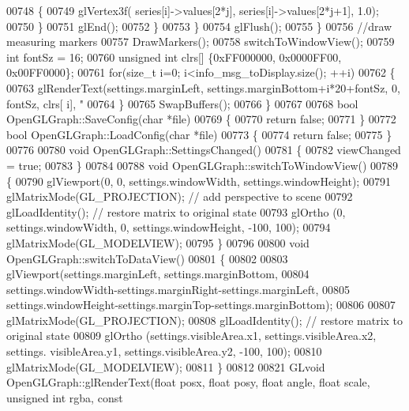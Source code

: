 \begin{DoxyCode}
{{{{{{{{00748                 \{
00749                     glVertex3f( series[i]->values[2*j], series[i]->values[2*j+1], 1.0);
00750                 \}
00751                 glEnd();
00752             \}
00753         \}
00754         glFlush();
00755     \}
00756     \textcolor{comment}{//draw measuring markers}
00757     DrawMarkers();
00758     switchToWindowView();
00759     \textcolor{keywordtype}{int} fontSz = 16;
00760     \textcolor{keywordtype}{unsigned} \textcolor{keywordtype}{int} clrs[] \{0xFF000000, 0x0000FF00, 0x00FF0000\};
00761     \textcolor{keywordflow}{for}(\textcolor{keywordtype}{size\_t} i=0; i<info_msg_toDisplay.size(); ++i)
00762     \{
00763         glRenderText(settings.marginLeft, settings.marginBottom+i*20+fontSz, 0, fontSz, clrs[
      i], \textcolor{stringliteral}{"%
00764     \}
00765     SwapBuffers();
00766 \}
00767 
00768 \textcolor{keywordtype}{bool} OpenGLGraph::SaveConfig(\textcolor{keywordtype}{char} *file)
00769 \{
00770     \textcolor{keywordflow}{return} \textcolor{keyword}{false};
00771 \}
00772 \textcolor{keywordtype}{bool} OpenGLGraph::LoadConfig(\textcolor{keywordtype}{char} *file)
00773 \{
00774     \textcolor{keywordflow}{return} \textcolor{keyword}{false};
00775 \}
00776 
00780 \textcolor{keywordtype}{void} OpenGLGraph::SettingsChanged()
00781 \{
00782     viewChanged = \textcolor{keyword}{true};
00783 \}
00784 
00788 \textcolor{keywordtype}{void} OpenGLGraph::switchToWindowView()
00789 \{
00790     glViewport(0, 0, settings.windowWidth, settings.windowHeight);
00791     glMatrixMode(GL_PROJECTION);    \textcolor{comment}{// add perspective to scene}
00792     glLoadIdentity();               \textcolor{comment}{// restore matrix to original state}
00793     glOrtho (0, settings.windowWidth, 0, settings.windowHeight, -100, 100);
00794     glMatrixMode(GL_MODELVIEW);
00795 \}
00796 
00800 \textcolor{keywordtype}{void} OpenGLGraph::switchToDataView()
00801 \{
00802 
00803     glViewport(settings.marginLeft, settings.marginBottom,
00804                 settings.windowWidth-settings.marginRight-settings.marginLeft,
00805                 settings.windowHeight-settings.marginTop-settings.marginBottom);
00806 
00807     glMatrixMode(GL_PROJECTION);
00808     glLoadIdentity();               \textcolor{comment}{// restore matrix to original state}
00809     glOrtho (settings.visibleArea.x1, settings.visibleArea.x2, settings.
      visibleArea.y1, settings.visibleArea.y2, -100, 100);
00810     glMatrixMode(GL_MODELVIEW);
00811 \}
00812 
00821 GLvoid OpenGLGraph::glRenderText(\textcolor{keywordtype}{float} posx, \textcolor{keywordtype}{float} posy, \textcolor{keywordtype}{float} angle, \textcolor{keywordtype}{float} scale, \textcolor{keywordtype}{unsigned} \textcolor{keywordtype}{int} rgba, \textcolor{keyword}{const}
}}}}}}}}}
\end{DoxyCode}
